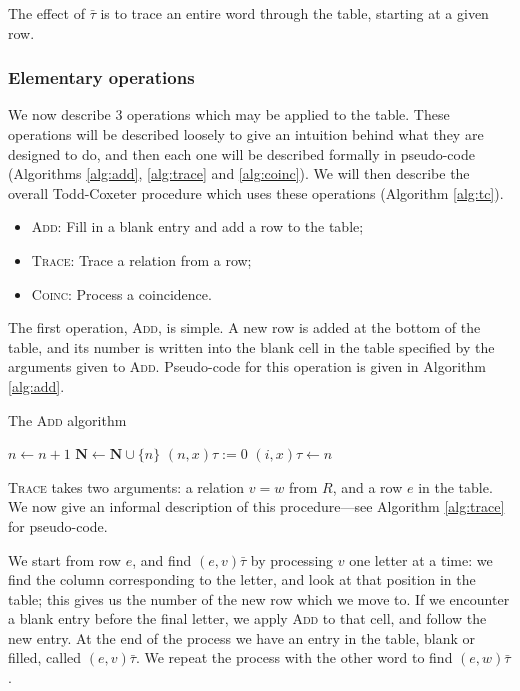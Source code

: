 The effect of $\bar\tau$ is to trace an entire word through the table, starting
at a given row.

\subsubsection{Elementary operations}

We now describe 3 operations which may be applied to the table.  These
operations will be described loosely to give an intuition behind what they are
designed to do, and then each one will be described formally in pseudo-code
(Algorithms \ref{alg:add}, \ref{alg:trace} and \ref{alg:coinc}).  We will then
describe the overall Todd-Coxeter procedure which uses these operations
(Algorithm \ref{alg:tc}).

\begin{itemize}
\item \textsc{Add}: Fill in a blank entry and add a row to the table;
\item \textsc{Trace}: Trace a relation from a row;
\item \textsc{Coinc}: Process a coincidence.
\end{itemize}

The first operation, \textsc{Add}, is simple.  A new row is added at the bottom
of the table, and its number is written into the blank cell in the table
specified by the arguments given to \textsc{Add}.  Pseudo-code for this
operation is given in Algorithm \ref{alg:add}.

\begin{algorithm}
\caption{The \textsc{Add} algorithm}
\label{alg:add}
\begin{algorithmic}[1]
\State $n \gets n + 1$
\State $\mathbf{N} \gets \mathbf{N} \cup \{n\}$
  \State $(n, x)\tau := 0$
\EndFor
\State $(i, x)\tau \gets n$  
\EndProcedure
\end{algorithmic}
\end{algorithm}

\textsc{Trace} takes two arguments: a relation $v=w$ from $R$, and a row $e$
in the table.  We now give an informal description of this procedure---see
Algorithm \ref{alg:trace} for pseudo-code.

We start from row $e$, and find $(e, v)\bar\tau$ by processing $v$ one letter at a time: we
find the column corresponding to the letter, and look at that position in the
table; this gives us the number of the new row which we move to.  If we
encounter a blank entry before the final letter, we apply \textsc{Add} to that
cell, and follow the new entry.  At the end of the process we have an entry in
the table, blank or filled, called $(e, v)\bar\tau$.  We repeat the
process with the other word to find $(e, w)\bar\tau$.

